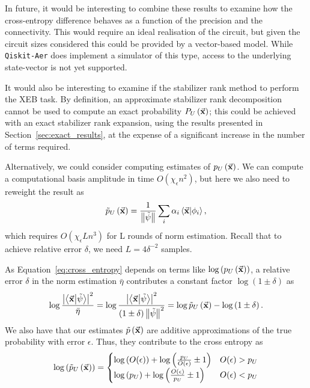 In future, it would be interesting to combine these results to examine how the cross-entropy difference behaves as a function of the precision and the connectivity. This would require an ideal realisation of the circuit, but given the circuit sizes considered this could be provided by a vector-based model. While \texttt{Qiskit-Aer} does implement a simulator of this type, access to the underlying state-vector is not yet supported.\par
It would also be interesting to examine if the stabilizer rank method to perform the XEB task. By definition, an approximate stabilizer rank decomposition cannot be used to compute an exact probability $P_{U}\left(\va{x}\right)$; this could be achieved with an exact stabilizer rank expansion, using the results presented in Section~\ref{sec:exact_results}, at the expense of a significant increase in the number of terms required.\par
Alternatively, we could consider computing estimates of $p_{U}\left(\va{x}\right)$. We can compute a computational basis amplitude in time $O\left(\chi_{\epsilon} n^{2}\right)$, but here we also need to reweight the result as
\[\tilde{p}_{U}\left(\va{x}\right)=\frac{1}{\norm{\tilde{\psi}}}\sum_{i}\alpha_{i}\braket{\va{x}}{\phi_{i}},\]
which requires $O\left(\chi_{\epsilon}Ln^{3}\right)$ for L rounds of norm estimation. Recall that to achieve relative error $\delta$, we need $L=4\delta^{-2}$ samples.\par
As Equation~\ref{eq:cross_entropy} depends on terms like $\log\left(p_{U}\left(\va{x}\right)\right)$, a relative error $\delta$ in the norm estimation $\bar{\eta}$ contributes a constant factor $\log\left(1\pm \delta\right)$ as
\[\log{\frac{\left|\braket{\va{x}}{\tilde{\psi}}\right|^{2}}{\bar{\eta}}}=\log\frac{\left|\braket{\va{x}}{\tilde{\psi}}\right|^{2}}{\left(1\pm\delta\right)\norm{\tilde{\psi}}^{2}} = \log\tilde{p}_{U}\left(\va{x}\right) -\log\left(1\pm\delta\right). \]
We also have that our estimates $\tilde{p}\left(\va{x}\right)$ are additive approximations of the true probability with error $\epsilon$. Thus, they contribute to the cross entropy as
\[\log\left(\tilde{p}_{U}\left(\va{x}\right)\right) = \begin{cases}
\log\left(O(\epsilon)\right) + \log\left(\frac{p_{U}}{O(\epsilon)}\pm 1\right) & O(\epsilon) > p_{U} \\
\log\left(p_{U}\right) + \log\left(\frac{O(\epsilon)}{p_{U}}\pm 1\right) & O(\epsilon) < p_{U} \\
\end{cases}\]
